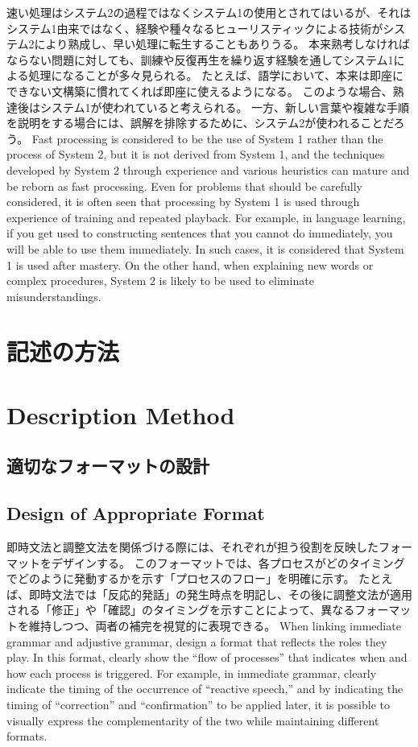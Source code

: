 \documentclass[a4paper,xelatex,ja=standard]{bxjsarticle}
\begin{document}
\ifJPN
速い処理はシステム2の過程ではなくシステム1の使用とされてはいるが、それはシステム1由来ではなく、経験や種々なるヒューリスティックによる技術がシステム2により熟成し、早い処理に転生することもありうる\autocite{Evans2008}。
本来熟考しなければならない問題に対しても、訓練や反復再生を繰り返す経験を通してシステム1による処理になることが多々見られる。
たとえば、語学において、本来は即座にできない文構築に慣れてくれば即座に使えるようになる。
このような場合、熟達後はシステム1が使われていると考えられる。
一方、新しい言葉や複雑な手順を説明をする場合には、誤解を排除するために、システム2が使われることだろう。
\else
  Fast processing is considered to be the use of System 1 rather than the process of System 2, but it is not derived from System 1, and the techniques developed by System 2 through experience and various heuristics can mature and be reborn as fast processing.\autocite{Evans2008}
Even for problems that should be carefully considered, it is often seen that processing by System 1 is used through experience of training and repeated playback.
For example, in language learning, if you get used to constructing sentences that you cannot do immediately, you will be able to use them immediately.
In such cases, it is considered that System 1 is used after mastery.
On the other hand, when explaining new words or complex procedures, System 2 is likely to be used to eliminate misunderstandings.
\fi

\ifJPN
\section{記述の方法}
\else
\section{Description Method}
\fi

\ifJPN
\subsection{適切なフォーマットの設計}
\else
\subsection{Design of Appropriate Format}
\fi

\ifJPN
即時文法と調整文法を関係づける際には、それぞれが担う役割を反映したフォーマットをデザインする。
このフォーマットでは、各プロセスがどのタイミングでどのように発動するかを示す「プロセスのフロー」を明確に示す。
たとえば、即時文法では「反応的発話」の発生時点を明記し、その後に調整文法が適用される「修正」や「確認」のタイミングを示すことによって、異なるフォーマットを維持しつつ、両者の補完を視覚的に表現できる。
\else
When linking immediate grammar and adjustive grammar, design a format that reflects the roles they play.
In this format, clearly show the ``flow of processes'' that indicates when and how each process is triggered.
For example, in immediate grammar, clearly indicate the timing of the occurrence of ``reactive speech,'' and by indicating the timing of ``correction'' and ``confirmation'' to be applied later, it is possible to visually express the complementarity of the two while maintaining different formats.
\fi
\end{document}

